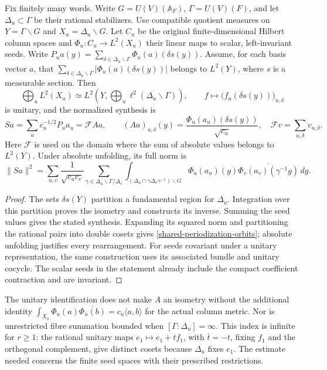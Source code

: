 \begin{proposition}
\label{shared-common-periodization}
Fix finitely many words. Write \(G=U(V)(\mathbb A_F)\),
\(\Gamma=U(V)(F)\), and let \(\Delta_u\subset\Gamma\) be their
rational stabilizers. Use compatible quotient measures on
\(Y=\Gamma\backslash G\) and \(X_u=\Delta_u\backslash G\).
Let \(C_u\) be the original finite-dimensional Hilbert column spaces
and \(\Phi_u:C_u\to L^2(X_u)\) their linear maps to scalar,
left-invariant seeds. Write
\(P_ua(y)=\sum_{\delta\in\Delta_u\backslash\Gamma}
\Phi_u(a)(\delta s(y))\).
Assume, for each basis vector \(a\), that
\(\sum_{\delta\in\Delta_u\backslash\Gamma}
 |\Phi_u(a)(\delta s(y))|\) belongs to \(L^2(Y)\), where \(s\)
is a measurable section. Then
\[
 \bigoplus_u L^2(X_u)\simeq
 L^2\!\left(Y,\bigoplus_u\ell^2(\Delta_u\backslash\Gamma)\right),
 \qquad f\longmapsto\bigl(f_u(\delta s(y))\bigr)_{u,\delta}
\]
is unitary, and the normalized synthesis is
\[
 Sa=\sum_uc_u^{-1/2}P_ua_u=\mathcal F Aa,\qquad
 (Aa)_{u,\delta}(y)=\frac{\Phi_u(a_u)(\delta s(y))}{\sqrt{c_u}},
 \quad \mathcal Fv=\sum_{u,\delta}v_{u,\delta}.
\]
Here \(\mathcal F\) is used on the domain where the sum of absolute
values belongs to \(L^2(Y)\). Under absolute unfolding, its full norm is
\begin{equation}\label{shared-periodization-orbits}
 \|Sa\|^2=\sum_{u,v}\frac1{\sqrt{c_uc_v}}
 \sum_{\gamma\in\Delta_u\backslash\Gamma/\Delta_v}
 \int_{(\Delta_u\cap\gamma\Delta_v\gamma^{-1})\backslash G}
 \Phi_u(a_u)(g)\overline{\Phi_v(a_v)(\gamma^{-1}g)}\,dg.
\end{equation}
\end{proposition}
\begin{proof}
The sets \(\delta s(Y)\) partition a fundamental region for
\(\Delta_u\). Integration over this partition proves the isometry
and constructs its inverse. Summing the seed values gives the stated
synthesis. Expanding its squared norm and partitioning the rational
pairs into double cosets gives \eqref{shared-periodization-orbits};
absolute unfolding justifies every rearrangement. For seeds covariant
under a unitary representation, the same construction uses its
associated bundle and unitary cocycle. The scalar seeds in the statement
already include the compact coefficient contraction and are invariant.
\end{proof}

The unitary identification does not make \(A\) an isometry without
the additional identity
\(\int_{X_u}\Phi_u(a)\overline{\Phi_u(b)}=c_u\langle a,b\rangle\)
for the actual column metric. Nor is unrestricted fibre summation
bounded when \([\Gamma:\Delta_u]=\infty\). This index is infinite
for \(r\ge1\): the rational unitary maps
\(e_1\mapsto e_1+t f_1\), with \(\bar t=-t\), fixing \(f_1\)
and the orthogonal complement, give distinct cosets because
\(\Delta_u\) fixes \(e_1\). The estimate needed concerns the
finite seed spaces with their prescribed restrictions.

